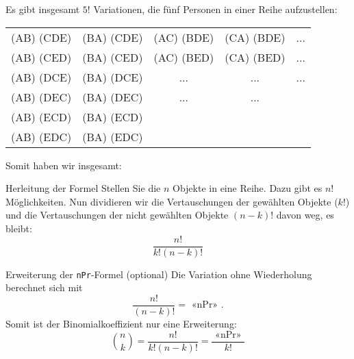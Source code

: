 Es gibt insgesamt $5!$ Variationen, die fünf Personen in einer Reihe
aufzustellen:

\begin{tabular}{c|c||c|c||c}\hline
  (AB) (CDE) & (BA) (CDE) & (AC) (BDE) & (CA) (BDE) & ...\\
  (AB) (CED) & (BA) (CED) & (AC) (BED) & (CA) (BED) & ...\\
  (AB) (DCE) & (BA) (DCE) & ... & ...       & ...\\
  (AB) (DEC) & (BA) (DEC) & ... & ...       & \\
  (AB) (ECD) & (BA) (ECD) & & & \\
  (AB) (EDC) & (BA) (EDC) & & & \\\hline
\end{tabular}


\noTRAINER{\vspace{2cm}}

  Somit haben wir insgesamt:


\begin{bemerkung}{Herleitung der Formel}{}
Stellen Sie die $n$ Objekte in eine Reihe. Dazu gibt
es $n!$ Möglichkeiten. Nun dividieren wir die Vertauschungen der
gewählten Objekte ($k!$) und die Vertauschungen der nicht gewählten
Objekte $(n-k)!$ davon weg, es bleibt: $$\frac{n!}{k!(n-k)!}$$
\end{bemerkung}

\begin{bemerkung}{Erweiterung der \texttt{nPr}-Formel (optional)}{}
  Die Variation ohne Wiederholung berechnet sich mit
  $$\frac{n!}{(n-k)!} = \text{ «nPr» }.$$
  Somit ist der Binomialkoeffizient nur eine Erweiterung:
  $${n \choose k} = \frac{n!}{k!(n-k)!} = \frac{\text{ «nPr» }}{k!}$$
  \end{bemerkung}
\newpage

